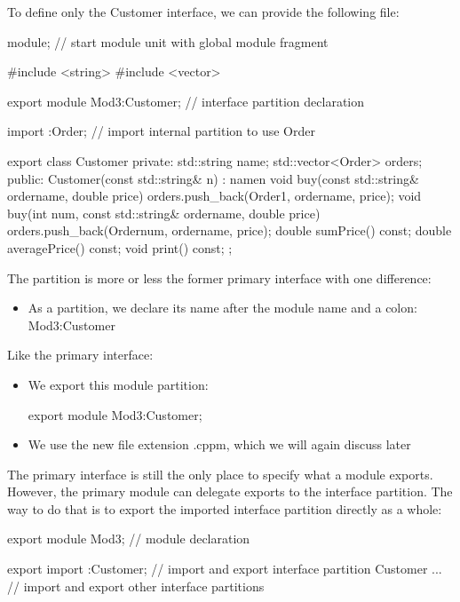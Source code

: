 To define only the Customer interface, we can provide the following file:


\begin{cpp}
module; // start module unit with global module fragment

#include <string>
#include <vector>

export module Mod3:Customer; // interface partition declaration

import :Order; // import internal partition to use Order

export class Customer {
private:
	std::string name;
	std::vector<Order> orders;
public:
	Customer(const std::string& n)
	: name{n} {
	}
	void buy(const std::string& ordername, double price) {
		orders.push_back(Order{1, ordername, price});
	}
	void buy(int num, const std::string& ordername, double price) {
		orders.push_back(Order{num, ordername, price});
	}
	double sumPrice() const;
	double averagePrice() const;
	void print() const;
};
\end{cpp}

The partition is more or less the former primary interface with one difference:

\begin{itemize}
\item 
As a partition, we declare its name after the module name and a colon: Mod3:Customer
\end{itemize}

Like the primary interface:

\begin{itemize}
\item 
We export this module partition:

\begin{cpp}
export module Mod3:Customer;
\end{cpp}

\item 
We use the new file extension .cppm, which we will again discuss later
\end{itemize}

The primary interface is still the only place to specify what a module exports. However, the primary module can delegate exports to the interface partition. The way to do that is to export the imported interface partition directly as a whole:


\begin{cpp}
export module Mod3; // module declaration

export import :Customer; // import and export interface partition Customer
... // import and export other interface partitions
\end{cpp}

